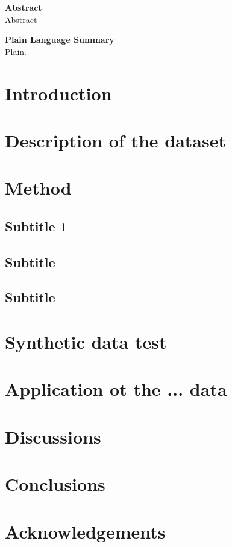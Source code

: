 \documentclass[draft,jgr]{AGUTeX}
\begin{document}
\begin{article}
\large{\textbf{Abstract}}\\
Abstract
\newpage

\large{\textbf{Plain Language Summary}}\\
Plain.

\section{Introduction}



\section{Description of the dataset}

\section{Method}
\subsection{Subtitle 1}

\subsection{Subtitle}

\subsection{Subtitle}


\section{Synthetic data test}



\section{Application ot the ... data}




\section{Discussions}
\section{Conclusions}

\section{Acknowledgements}


\end{article}
\end{document}
